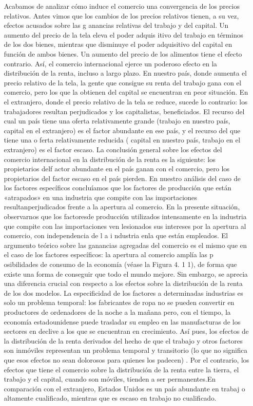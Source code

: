 \documentclass[10pt,a4paper]{article}
\begin{document}
Acabamos de analizar cómo induce el comercio una convergencia de los precios relativos. Antes vimos que los cambios de los precios relativos tienen, a su vez, efectos acusados sobre las g anancias relativas del trabajo y del capital. Un aumento del precio de la tela eleva el poder adquis itivo del trabajo en términos de los dos bienes, mientras que disminuye el poder adquisitivo del capital en función de ambos bienes. Un aumento del precio de los alimentos tiene el efecto contrario. Así, el comercio internacional ejerce un poderoso efecto en la distribución de la renta, incluso a largo plazo. En nuestro país, donde aumenta el precio relativo de la tela, la gente que consigue su renta del trabajo gana con el comercio, pero los que la obtienen del capital se encuentran en peor situación. En el extranjero, donde el precio relativo de la tela se reduce, sucede lo contrario: los trabajadores resultan perjudicados y los capitalistas, beneficiados. El recurso del cual un país tiene una oferta relativamente grande (trabajo en nuestro país, capital en el extranjero) es el factor abundante en ese país, y el recurso del que tiene una o ferta relativamente reducida ( capital en nuestro país, trabajo en el extranjero) es el factor escaso. La conclusión general sobre los efectos del comercio internacional en la distribución de la renta es la siguiente: los propietarios delf actor abundante en el país ganan con el comercio, pero los propietarios del factor escaso en el país pierden. En nuestro análisis del caso de los factores específicos concluíamos que los factores de producción que están «atrapados» en una industria que compite con las importaciones resultanperjudicados frente a la apertura al comercio. En la presente situación, observarnos que los factoresde producción utilizados intensamente en la industria que compite con las importaciones ven lesionados sus intereses por la apertura al comercio, con independencia de l a i ndustria enla que están empleados. El argumento teórico sobre las ganancias agregadas del comercio es el mismo que en el caso de los factores específicos: la apertura al comercio amplía las p osibilidades de consumo de la economía (véase la Figura 4. 1 1), de forma que existe una forma de conseguir que todo el mundo mejore. Sin embargo, se aprecia una diferencia crucial con respecto a los efectos sobre la distribución de la renta de los dos modelos. La especificidad de los factores a determinadas industrias es solo un problema temporal: los fabricantes de ropa no se pueden convertir en productores de ordenadores de la noche a la mañana pero, con el tiempo, la economía estadounidense puede trasladar su empleo en las manufacturas de los sectores en declive a los que se encuentran en crecimiento. Así pues, los efectos de la distribución de la renta derivados del hecho de que el trabajo y otros factores son inmóviles representan un problema temporal y transitorio (lo que no significa que esos efectos no sean dolorosos para quienes los padecen) . Por el contrario, los efectos que tiene el comercio sobre la distribución de la renta entre la tierra, el trabajo y el capital, cuando son móviles, tienden a ser permanentes.En comparación con el extranjero, Estados Unidos es un país abundante en trabaj o altamente cualificado, mientras que es escaso en trabajo no cualificado. 
\end{document}

